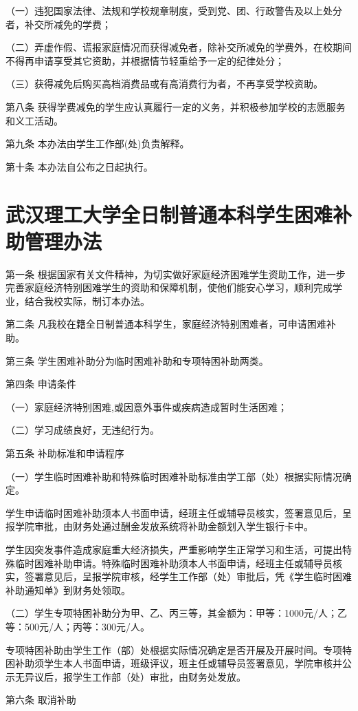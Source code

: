 \documentclass[UTF8,12pt,a4paper]{report}
\begin{document}
（一）违犯国家法律、法规和学校规章制度，受到党、团、行政警告及以上处分者，补交所减免的学费；

（二）弄虚作假、谎报家庭情况而获得减免者，除补交所减免的学费外，在校期间不得再申请享受其它资助，并根据情节轻重给予一定的纪律处分；

（三）获得减免后购买高档消费品或有高消费行为者，不再享受学校资助。

第八条 获得学费减免的学生应认真履行一定的义务，并积极参加学校的志愿服务和义工活动。

第九条 本办法由学生工作部(处)负责解释。

第十条 本办法自公布之日起执行。

\chapter{武汉理工大学全日制普通本科学生困难补助管理办法}
第一条 根据国家有关文件精神，为切实做好家庭经济困难学生资助工作，进一步完善家庭经济特别困难学生的资助和保障机制，使他们能安心学习，顺利完成学业，结合我校实际，制订本办法。

第二条 凡我校在籍全日制普通本科学生，家庭经济特别困难者，可申请困难补助。

第三条 学生困难补助分为临时困难补助和专项特困补助两类。

第四条 申请条件

（一）家庭经济特别困难,或因意外事件或疾病造成暂时生活困难；

（二）学习成绩良好，无违纪行为。

第五条 补助标准和申请程序

（一）学生临时困难补助和特殊临时困难补助标准由学工部（处）根据实际情况确定。

学生申请临时困难补助须本人书面申请，经班主任或辅导员核实，签署意见后，呈报学院审批，由财务处通过酬金发放系统将补助金额划入学生银行卡中。

学生因突发事件造成家庭重大经济损失，严重影响学生正常学习和生活，可提出特殊临时困难补助申请。特殊临时困难补助须本人书面申请，经班主任或辅导员核实，签署意见后，呈报学院审核，经学生工作部（处）审批后，凭《学生临时困难补助通知单》到财务处领取。

（二）学生专项特困补助分为甲、乙、丙三等，其金额为：甲等：1000元/人；乙等：500元/人；丙等：300元/人。

专项特困补助由学生工作（部）处根据实际情况确定是否开展及开展时间。专项特困补助须学生本人书面申请，班级评议，班主任或辅导员签署意见，学院审核并公示无异议后，报学生工作部（处）审批，由财务处发放。

第六条 取消补助
\end{document}
